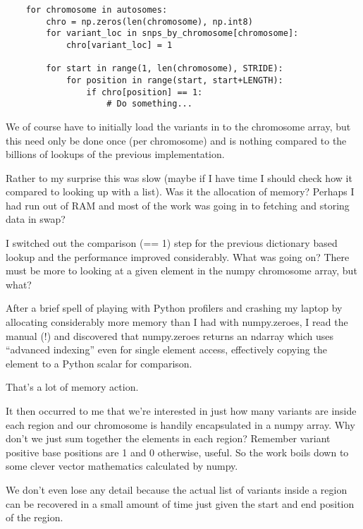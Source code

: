 \begin{verbatim}
    for chromosome in autosomes:
        chro = np.zeros(len(chromosome), np.int8)
        for variant_loc in snps_by_chromosome[chromosome]:
            chro[variant_loc] = 1

        for start in range(1, len(chromosome), STRIDE):
            for position in range(start, start+LENGTH):
                if chro[position] == 1:
                    # Do something...
\end{verbatim}

We of course have to initially load the variants in to the chromosome array,
but this need only be done once (per chromosome) and is nothing compared to the
billions of lookups of the previous implementation.

Rather to my surprise this was slow  (maybe if I have time I should
check how it compared to looking up with a list). Was it the allocation of
memory? Perhaps I had run out of RAM and most of the work was going in to
fetching and storing data in swap?

I switched out the comparison (== 1) step for the previous dictionary based
lookup and the performance improved considerably. What was going on? There must
be more to looking at a given element in the numpy chromosome array, but what?

After a brief spell of playing with Python profilers and crashing my laptop by
allocating considerably more memory than I had with numpy.zeroes, I read the
manual (!) and discovered that numpy.zeroes returns an ndarray which uses
“advanced indexing” even for single element access, effectively copying the
element to a Python scalar for comparison.

That’s a lot of memory action.

It then occurred to me that we’re interested in just how many variants are
inside each region and our chromosome is handily encapsulated in a numpy array.
Why don’t we just sum together the elements in each region? Remember variant
positive base positions are 1 and 0 otherwise, useful. So the work boils down
to some clever vector mathematics calculated by numpy.

We don’t even lose any detail because the actual list of variants inside a
region can be recovered in a small amount of time just given the start and end
position of the region.

